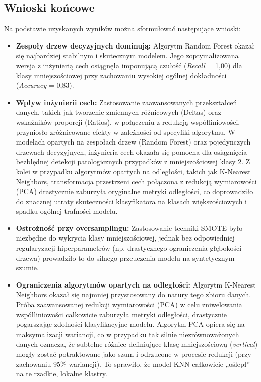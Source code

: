 \documentclass[12pt, a4paper]{article}
\begin{document}
\subsection{Wnioski końcowe}
Na podstawie uzyskanych wyników można sformułować następujące wnioski:
\begin{itemize}
    \item \textbf{Zespoły drzew decyzyjnych dominują:} Algorytm Random Forest okazał się najbardziej stabilnym i skutecznym modelem. Jego zoptymalizowana wersja z inżynierią cech osiągnęła imponującą czułość (\textit{Recall} = 1,00) dla klasy mniejszościowej przy zachowaniu wysokiej ogólnej dokładności (\textit{Accuracy} = 0,83).
     \item \textbf{Wpływ inżynierii cech:} Zastosowanie zaawansowanych przekształceń danych, takich jak tworzenie zmiennych różnicowych (Deltas) oraz wskaźników proporcji (Ratios), w połączeniu z redukcją współliniowości, przyniosło zróżnicowane efekty w zależności od specyfiki algorytmu. W modelach opartych na zespołach drzew (Random Forest) oraz pojedynczych drzewach decyzyjnych, inżynieria cech okazała się pomocna dla osiągnięcia bezbłędnej detekcji patologicznych przypadków z mniejszościowej klasy 2. Z kolei w przypadku algorytmów opartych na odległości, takich jak K-Nearest Neighbors, transformacja przestrzeni cech połączona z redukcją wymiarowości (PCA) drastycznie zaburzyła oryginalne metryki odległości, co doprowadziło do znacznej utraty skuteczności klasyfikatora na klasach większościowych i spadku ogólnej trafności modelu.
    \item \textbf{Ostrożność przy oversamplingu:} Zastosowanie techniki SMOTE było niezbędne do wykrycia klasy mniejszościowej, jednak bez odpowiedniej regularyzacji hiperparametrów (np. drastycznego ograniczenia głębokości drzewa) prowadziło to do silnego przeuczenia modelu na syntetycznym szumie.
\item \textbf{Ograniczenia algorytmów opartych na odległości:} Algorytm K-Nearest Neighbors okazał się najmniej przystosowany do natury tego zbioru danych. Próba zaawansowanej redukcji wymiarowości (PCA) w celu zniwelowania współliniowości całkowicie zaburzyła metryki odległości, drastycznie pogarszając zdolności klasyfikacyjne modelu. Algorytm PCA opiera się na maksymalizacji wariancji, co w przypadku tak silnie niezrównoważonych danych oznacza, że subtelne różnice definiujące klasę mniejszościową (\textit{vertical}) mogły zostać potraktowane jako szum i odrzucone w procesie redukcji (przy zachowaniu 95\% wariancji). To sprawiło, że model KNN całkowicie „oślepł” na te rzadkie, lokalne klastry.
\end{itemize}
\end{document}
